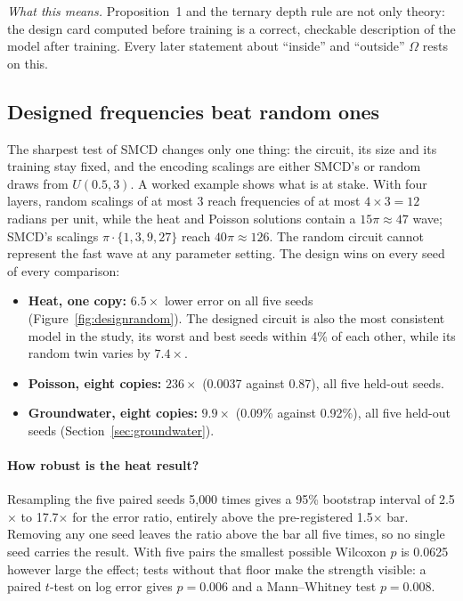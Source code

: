 \emph{What this means.} Proposition~1 and the ternary depth rule are not only theory: the
design card computed before training is a correct, checkable description of the model
after training. Every later statement about ``inside'' and ``outside'' $\Omega$ rests on
this.

\subsection{Designed frequencies beat random ones}
\label{sec:design}
The sharpest test of SMCD changes only one thing: the circuit, its size and its training
stay fixed, and the encoding scalings are either SMCD's or random draws from $U(0.5,3)$.
A worked example shows what is at stake. With four layers, random scalings of at most 3
reach frequencies of at most $4\times3=12$ radians per unit, while the heat and Poisson
solutions contain a $15\pi\approx47$ wave; SMCD's scalings $\pi\cdot\{1,3,9,27\}$ reach
$40\pi\approx126$. The random circuit cannot represent the fast wave at any parameter
setting. The design wins on every seed of every comparison:

\begin{itemize}
  \item \textbf{Heat, one copy:} $6.5\times$ lower error on all five seeds
    (Figure~\ref{fig:designrandom}). The designed circuit is also the most consistent
    model in the study, its worst and best seeds within 4\% of each other, while its
    random twin varies by $7.4\times$.
  \item \textbf{Poisson, eight copies:} $236\times$ (0.0037 against 0.87), all five
    held-out seeds.
  \item \textbf{Groundwater, eight copies:} $9.9\times$ (0.09\% against 0.92\%), all five
    held-out seeds (Section~\ref{sec:groundwater}).
\end{itemize}

\paragraph{How robust is the heat result?} Resampling the five paired seeds 5{,}000 times
gives a 95\% bootstrap interval of 2.5$\times$ to 17.7$\times$ for the error ratio, entirely
above the pre-registered 1.5$\times$ bar. Removing any one seed leaves the ratio above the
bar all five times, so no single seed carries the result. With five pairs the smallest
possible Wilcoxon $p$ is 0.0625 however large the effect; tests without that floor make
the strength visible: a paired $t$-test on log error gives $p=0.006$ and a Mann--Whitney
test $p=0.008$.

